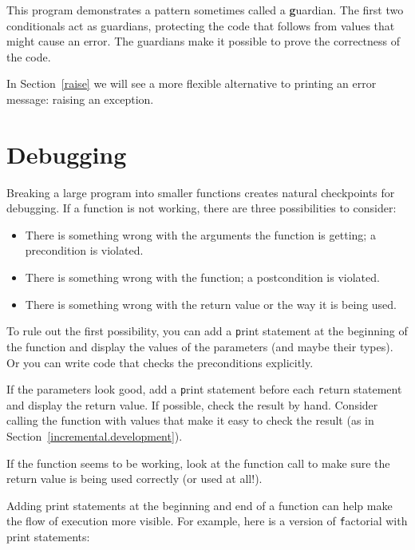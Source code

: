 \documentclass[
DIV=11,
fontsize=13,
twoside,
headinclude=false,
titlepage=firstiscover,
abstract=true,
headsepline=true,
footsepline=true,
chapterprefix=true, %
headings=big,
bibliography=totoc,%
captions=tableheading
]{scrbook}
\theoremstyle{definition}
\begin{document}
This program demonstrates a pattern sometimes called a {\textbf guardian}.
The first two conditionals act as guardians, protecting the code that
follows from values that might cause an error.  The guardians make it
possible to prove the correctness of the code.

In Section~\ref{raise} we will see a more flexible alternative to printing
an error message: raising an exception.


\section{Debugging}
\label{factdebug}

Breaking a large program into smaller functions creates natural
checkpoints for debugging.  If a function is not
working, there are three possibilities to consider:

\begin{itemize}

\item There is something wrong with the arguments the function
is getting; a precondition is violated.

\item There is something wrong with the function; a postcondition
is violated.

\item There is something wrong with the return value or the
way it is being used.

\end{itemize}

To rule out the first possibility, you can add a {\texttt print} statement
at the beginning of the function and display the values of the
parameters (and maybe their types).  Or you can write code
that checks the preconditions explicitly.

If the parameters look good, add a {\texttt print} statement before each
{\texttt return} statement and display the return value.  If
possible, check the result by hand.  Consider calling the
function with values that make it easy to check the result
(as in Section~\ref{incremental.development}).

If the function seems to be working, look at the function call
to make sure the return value is being used correctly (or used
at all!).

Adding print statements at the beginning and end of a function
can help make the flow of execution more visible.
For example, here is a version of {\texttt factorial} with
print statements:
\end{document}
